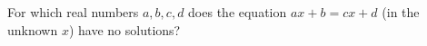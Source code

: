 For which real numbers $a,b,c,d$ does the equation $ax+b=cx+d$ (in the unknown $x$) have no solutions?
